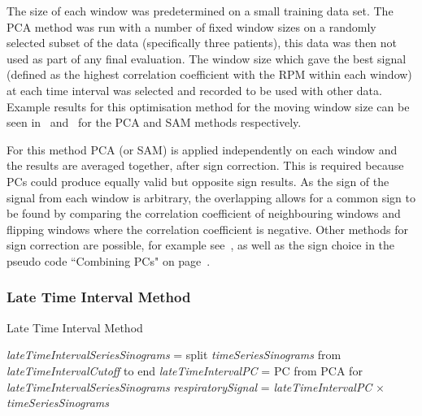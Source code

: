                 The size of each window was predetermined on a small training data set. The PCA method was run with a number of fixed window sizes on a randomly selected subset of the data (specifically three patients), this data was then not used as part of any final evaluation. The window size which gave the best signal (defined as the highest correlation coefficient with the \gls{RPM} within each window) at each time interval was selected and recorded to be used with other data. Example results for this optimisation method for the moving window size can be seen in~ and~ for the \gls{PCA} and \gls{SAM} methods respectively.
                    
                For this method \gls{PCA} (or \gls{SAM}) is applied independently on each window and the results are averaged together, after sign correction. This is required because \glspl{PC} could produce equally valid but opposite sign results. As the sign of the signal from each window is arbitrary,  the overlapping allows for a common sign to be found by comparing the correlation coefficient of neighbouring windows and flipping windows where the correlation coefficient is negative. Other methods for sign correction are possible, for example see~\parencite{Bertolli2017, Feng2018Self-gating:PET}, as well as the sign choice in the pseudo code ``Combining \glspl{PC}" on page~\pageref{alg:pca_data_driven_surrogate_signal_extraction_methods_for_dynamic_pet_methods_score_select_and_combine_method_combine_combine_pseudo_code}.

            \subsubsection{Late Time Interval Method} \label{sec:pca_data_driven_surrogate_signal_extraction_methods_for_dynamic_pet_methods_late_time_interval_method}
                \begin{algorithm}
                    \caption{Late Time Interval Method}
                    \;
                    \textit{lateTimeIntervalSeriesSinograms} = split \textit{timeSeriesSinograms} from \textit{lateTimeIntervalCutoff} to end\;
                    \textit{lateTimeIntervalPC} = \gls{PC} from \gls{PCA} for \textit{lateTimeIntervalSeriesSinograms}\;
                    \textit{respiratorySignal} = \textit{lateTimeIntervalPC} $\times$ \textit{timeSeriesSinograms}\;
                    \;
        
                    \label{alg:pca_data_driven_surrogate_signal_extraction_methods_for_dynamic_pet_methods_late_time_interval_method_pseudo_code}
                \end{algorithm}
                    
